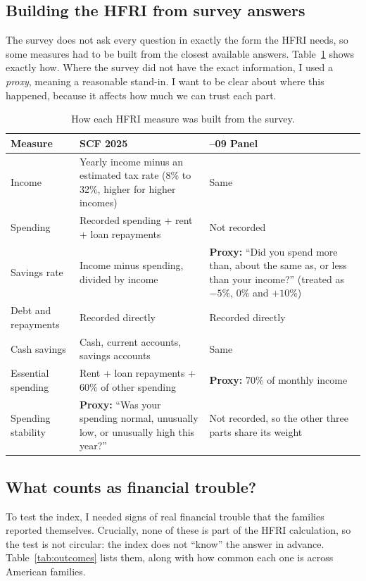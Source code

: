 \documentclass[11pt,a4paper]{article}
\newcommand{\pct}{\%}
\begin{document}
\subsection{Building the HFRI from survey answers}
The survey does not ask every question in exactly the form the HFRI needs, so some measures had to be built from the
closest available answers. Table~\ref{tab:mapping} shows exactly how. Where the survey did not have the exact
information, I used a \emph{proxy}, meaning a reasonable stand-in. I want to be clear about where this happened,
because it affects how much we can trust each part.

\begin{table}[H]
\centering\small
\caption{How each HFRI measure was built from the survey.}
\label{tab:mapping}
\begin{tabular}{>{\raggedright}p{3cm}>{\raggedright}p{5.8cm}>{\raggedright\arraybackslash}p{5.4cm}}
\toprule
Measure & SCF 2025 & 2007--09 Panel\\
\midrule
Income & Yearly income minus an estimated tax rate (8\pct{} to 32\pct{}, higher for higher incomes) & Same\\
Spending & Recorded spending + rent + loan repayments & Not recorded\\
Savings rate & Income minus spending, divided by income & \textbf{Proxy:} ``Did you spend more than, about the same as, or less than your income?'' (treated as $-5\pct$, $0\pct$ and $+10\pct$)\\
Debt and repayments & Recorded directly & Recorded directly\\
Cash savings & Cash, current accounts, savings accounts & Same\\
Essential spending & Rent + loan repayments + 60\pct{} of other spending & \textbf{Proxy:} 70\pct{} of monthly income\\
Spending stability & \textbf{Proxy:} ``Was your spending normal, unusually low, or unusually high this year?'' & Not recorded, so the other three parts share its weight\\
\bottomrule
\end{tabular}
\end{table}

\subsection{What counts as financial trouble?}
To test the index, I needed signs of real financial trouble that the families reported themselves. Crucially, none of
these is part of the HFRI calculation, so the test is not circular: the index does not ``know'' the answer in advance.
Table~\ref{tab:outcomes} lists them, along with how common each one is across American families.
\end{document}
